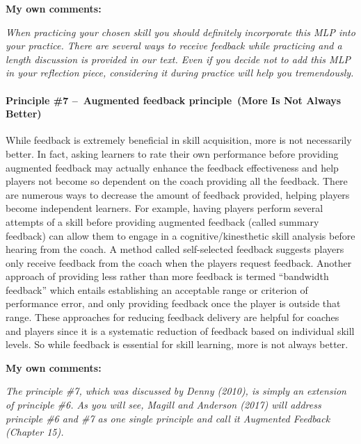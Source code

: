 \documentclass[
  letterpaper,
  DIV=11,
  numbers=noendperiod]{scrartcl}
\let\oldparagraph\paragraph
\renewcommand{\paragraph}[1]{\oldparagraph{#1}\mbox{}}
\begin{document}
\textbf{My own comments:}

\emph{When practicing your chosen skill you should definitely
incorporate this MLP into your practice. There are several ways to
receive feedback while practicing and a length discussion is provided in
our text. Even if you decide not to add this MLP in your reflection
piece, considering it during practice will help you tremendously.}

\hypertarget{principle-7-augmented-feedback-principle-more-is-not-always-better}{%
\paragraph{\texorpdfstring{\textbf{Principle \#7 --~Augmented feedback
principle~(More Is Not Always
Better)}}{Principle \#7 --~Augmented feedback principle~(More Is Not Always Better)}}\label{principle-7-augmented-feedback-principle-more-is-not-always-better}}

While feedback is extremely beneficial in skill acquisition, more is not
necessarily better. In fact, asking learners to rate their own
performance before providing augmented feedback may actually enhance the
feedback effectiveness and help players not become so dependent on the
coach providing all the feedback. There are numerous ways to decrease
the amount of feedback provided, helping players become independent
learners. For example, having players perform several attempts of a
skill before providing augmented feedback (called summary feedback) can
allow them to engage in a cognitive/kinesthetic skill analysis before
hearing from the coach. A method called self-selected feedback suggests
players only receive feedback from the coach when the players request
feedback. Another approach of providing less rather than more feedback
is termed ``bandwidth feedback'' which entails establishing an
acceptable range or criterion of performance error, and only providing
feedback once the player is outside that range. These approaches for
reducing feedback delivery are helpful for coaches and players since it
is a systematic reduction of feedback based on individual skill levels.
So while feedback is essential for skill learning, more is not always
better.

\textbf{My own comments:}

\emph{The principle \#7, which was discussed by Denny (2010), is simply
an extension of principle \#6. As you will see, Magill and Anderson
(2017) will address principle \#6 and \#7 as one single principle and
call it Augmented Feedback (Chapter 15).}
\end{document}
